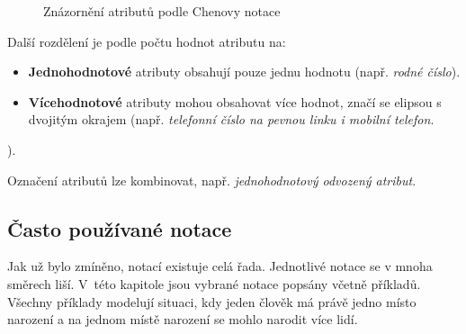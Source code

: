 \documentclass[czech,bachelor,public,dept460,male,oneside]{diploma}
\begin{document}
		\begin{figure}[!h]
			\centering
			\caption[Znázornění atributů podle Chenovy notace]{Znázornění atributů podle Chenovy notace}
		\end{figure}
	
		Další rozdělení je podle počtu hodnot atributu na:
	
		\begin{itemize}
			\item \textbf{Jednohodnotové} atributy obsahují pouze jednu hodnotu (např. \textit{rodné číslo}).
			\item \textbf{Vícehodnotové} atributy mohou obsahovat více hodnot, značí se elipsou s dvojitým okrajem (např. \textit{telefonní číslo na pevnou linku i mobilní telefon}.
		\end{itemize}).
			
		Označení atributů lze kombinovat, např. \textit{jednohodnotový odvozený atribut}.
		
	\subsection{Často používané notace} \label{secOftenNotation}
	Jak už bylo zmíněno, notací existuje celá řada. Jednotlivé notace se v mnoha směrech liší. V~této kapitole jsou vybrané notace popsány včetně příkladů. Všechny příklady modelují situaci, kdy jeden člověk má právě jedno místo narození a na jednom místě narození se mohlo narodit více lidí.
	
\end{document}
